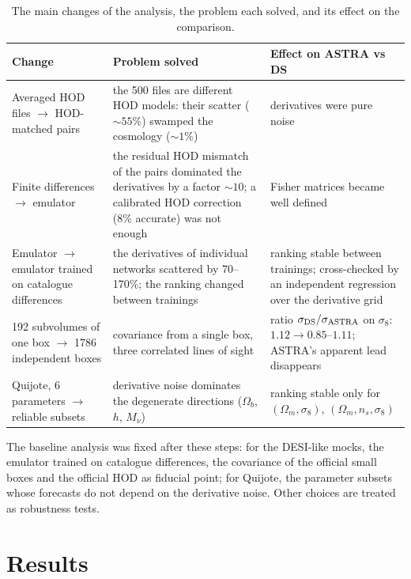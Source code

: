 \documentclass[11pt,twocolumn]{article}
\begin{document}
\begin{table}[t]
\centering\small
\begin{tabular}{p{4.2cm}p{6.3cm}p{6.3cm}}
\toprule
Change & Problem solved & Effect on ASTRA vs DS \\
\midrule
Averaged HOD files $\to$ HOD-matched pairs & the 500 files are different HOD models: their scatter ($\sim55\%$) swamped the cosmology ($\sim1\%$) & derivatives were pure noise \\
Finite differences $\to$ emulator & the residual HOD mismatch of the pairs dominated the derivatives by a factor $\sim10$; a calibrated HOD correction (8\% accurate) was not enough & Fisher matrices became well defined \\
Emulator $\to$ emulator trained on catalogue differences & the derivatives of individual networks scattered by 70--170\%; the ranking changed between trainings & ranking stable between trainings; cross-checked by an independent regression over the derivative grid \\
192 subvolumes of one box $\to$ 1786 independent boxes & covariance from a single box, three correlated lines of sight & ratio $\sigma_{\rm DS}/\sigma_{\rm ASTRA}$ on $\sigma_8$: $1.12\to0.85$--$1.11$; ASTRA's apparent lead disappears \\
Quijote, 6 parameters $\to$ reliable subsets & derivative noise dominates the degenerate directions ($\Omega_b$, $h$, $M_\nu$) & ranking stable only for $(\Omega_m,\sigma_8)$, $(\Omega_m,n_s,\sigma_8)$ \\
\bottomrule
\end{tabular}
\caption{The main changes of the analysis, the problem each solved, and its effect on the comparison.}
\label{tab:evolution}
\end{table}

The baseline analysis was fixed after these steps: for the DESI-like mocks, the emulator trained on catalogue differences, the covariance of the official small boxes and the official HOD as fiducial point; for Quijote, the parameter subsets whose forecasts do not depend on the derivative noise. Other choices are treated as robustness tests.

\section{Results}
\label{sec:results}
\end{document}
